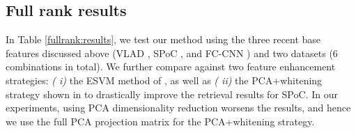



\subsection{Full rank results}
In Table \ref{fullrank:results}, we test our method using the three recent base features discussed above (VLAD \cite{Delhumeau2013}, SPoC \cite{babenko15}, and FC-CNN \cite{Sharif}) and two datasets (6 combinations in total). We further compare against two feature enhancement strategies: {\it ( i)} the ESVM method of \cite{ZePe15}, as well as {\it ( ii)} the PCA+whitening strategy shown in \cite{babenko15} to drastically improve the retrieval results for SPoC. In our experiments, using PCA dimensionality reduction worsens the results, and hence we use the full PCA projection matrix for the PCA+whitening strategy.

